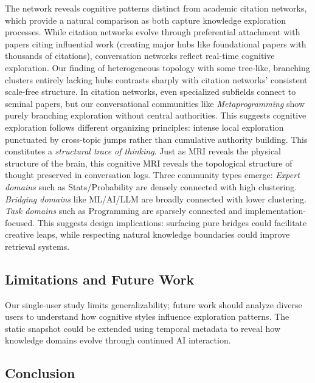 \documentclass{svproc}
\begin{document}
The network reveals cognitive patterns distinct from academic citation networks, which provide a natural comparison as both capture knowledge exploration processes. While citation networks evolve through preferential attachment with papers citing influential work (creating major hubs like foundational papers with thousands of citations), conversation networks reflect real-time cognitive exploration. Our finding of heterogeneous topology with some tree-like, branching clusters entirely lacking hubs contrasts sharply with citation networks' consistent scale-free structure. In citation networks, even specialized subfields connect to seminal papers, but our conversational communities like \emph{Metaprogramming} show purely branching exploration without central authorities. This suggests cognitive exploration follows different organizing principles: intense local exploration punctuated by cross-topic jumps rather than cumulative authority building. This constitutes a \emph{structural trace of thinking}. Just as MRI reveals the physical structure of the brain, this cognitive MRI reveals the topological structure of thought preserved in conversation logs. Three community types emerge: \emph{Expert domains} such as Stats/Probability are densely connected with high clustering. \emph{Bridging domains} like ML/AI/LLM are broadly connected with lower clustering. \emph{Task domains} such as Programming are sparsely connected and implementation-focused. This suggests design implications: surfacing pure bridges could facilitate creative leaps, while respecting natural knowledge boundaries could improve retrieval systems.

\subsection{Limitations and Future Work}

Our single-user study limits generalizability; future work should analyze diverse users to understand how cognitive styles influence exploration patterns. The static snapshot could be extended using temporal metadata to reveal how knowledge domains evolve through continued AI interaction.

\subsection{Conclusion}
\end{document}
